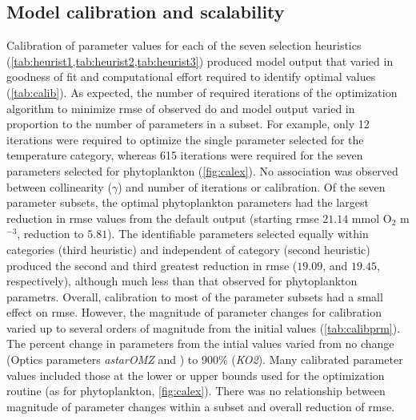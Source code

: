 \documentclass[review]{elsarticle}\usepackage[]{graphicx}\usepackage[]{color}
\begin{document}
\subsection{Model calibration and scalability}



Calibration of parameter values for each of the seven selection heuristics (\cref{tab:heurist1,tab:heurist2,tab:heurist3}) produced model output that varied in goodness of fit and computational effort required to identify optimal values (\cref{tab:calib}).  As expected, the number of required iterations of the optimization algorithm to minimize \ac{rmse} of observed \ac{do} and model output varied in proportion to the number of parameters in a subset.  For example, only 12 iterations were required to optimize the single parameter selected for the temperature category, whereas 615 iterations were required for the seven parameters selected for phytoplankton (\cref{fig:calex}).  No association was observed between collinearity ($\gamma$) and number of iterations or calibration.  Of the seven parameter subsets, the optimal phytoplankton parameters had the largest reduction in \ac{rmse} values from the default output (starting \ac{rmse} $21.14$ mmol O$_2$ m$^{-3}$, reduction to $5.81$).  The identifiable parameters selected equally within categories (third heuristic) and independent of category (second heuristic) produced the second and third greatest reduction in \ac{rmse} ($19.09$, and $19.45$, respectively), although much less than that observed for phytoplankton parametrs. Overall, calibration to most of the parameter subsets had a small effect on \ac{rmse}.  However, the magnitude of parameter changes for calibration varied up to several orders of magnitude from the initial values (\cref{tab:calibprm}).  The percent change in parameters from the intial values varied from no change (Optics parameters \textit{astarOMZ} and ) to 900\% (\textit{KO2}).  Many calibrated parameter values included those at the lower or upper bounds used for the optimization routine (as for phytoplankton, \cref{fig:calex}).  There was no relationship between magnitude of parameter changes within a subset and overall reduction of \ac{rmse}.
\end{document}
